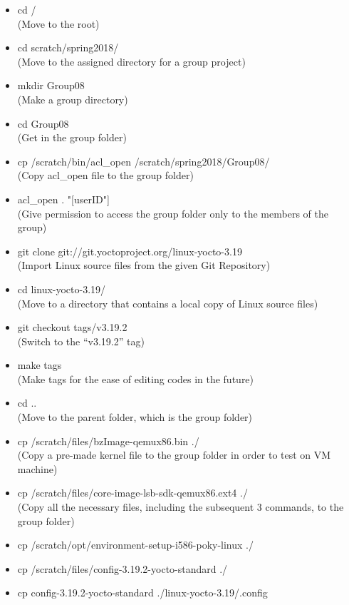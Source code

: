 \documentclass[journal,onecolumn]{IEEEtran}
\begin{document}
\begin{itemize}
\item cd /						
								\\(Move to the root)
\item cd scratch/spring2018/	
								\\(Move to the assigned directory for a group project)
\item mkdir Group08				
								\\(Make a group directory)
\item cd Group08				
								\\(Get in the group folder)
\item cp /scratch/bin/acl\_open /scratch/spring2018/Group08/	
								\\(Copy acl\_open file to the group folder) 
\item acl\_open . "[userID"]		
								\\(Give permission to access the group folder only to the members of the group)
\item git clone git://git.yoctoproject.org/linux-yocto-3.19 
								\\(Import Linux source files from the given Git Repository)
\item cd linux-yocto-3.19/		
								\\(Move to a directory that contains a local copy of Linux source files)
\item git checkout tags/v3.19.2	
								\\(Switch to the “v3.19.2” tag)
\item make tags					
								\\(Make tags for the ease of editing codes in the future)
\item cd ..						
								\\(Move to the parent folder, which is the group folder)
\item cp /scratch/files/bzImage-qemux86.bin ./
								\\(Copy a pre-made kernel file to the group folder in order to test on VM machine)
\item cp /scratch/files/core-image-lsb-sdk-qemux86.ext4 ./
								\\(Copy all the necessary files, including the subsequent 3 commands, to the group folder)
\item cp /scratch/opt/environment-setup-i586-poky-linux ./
\item cp /scratch/files/config-3.19.2-yocto-standard ./
\item cp config-3.19.2-yocto-standard ./linux-yocto-3.19/.config

\end{itemize}
\end{document}

